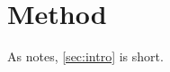 \section{Method}\label{sec:method}
As \citep[see][p.~3]{lamport1994} notes, \ref{sec:intro} is short.
